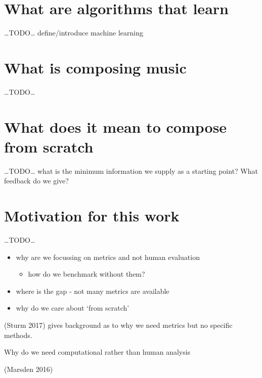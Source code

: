 \documentclass[12pt,a4paper,]{report}
\providecommand{\tightlist}{%
  \setlength{\itemsep}{0pt}\setlength{\parskip}{0pt}}
\begin{document}
\hypertarget{what-are-algorithms-that-learn}{%
\section{What are algorithms that
learn}\label{what-are-algorithms-that-learn}}

\ldots TODO\ldots{} define/introduce machine learning

\hypertarget{what-is-composing-music}{%
\section{What is composing music}\label{what-is-composing-music}}

\ldots TODO\ldots{}

\hypertarget{what-does-it-mean-to-compose-from-scratch}{%
\section{What does it mean to compose from
scratch}\label{what-does-it-mean-to-compose-from-scratch}}

\ldots TODO\ldots{} what is the minimum information we supply as a
starting point? What feedback do we give?

\hypertarget{motivation-for-this-work}{%
\section{Motivation for this work}\label{motivation-for-this-work}}

\ldots TODO\ldots{}

\begin{itemize}
\tightlist
\item
  why are we focussing on metrics and not human evaluation

  \begin{itemize}
  \tightlist
  \item
    how do we benchmark without them?
  \end{itemize}
\item
  where is the gap - not many metrics are available
\item
  why do we care about `from scratch'
\end{itemize}

(Sturm 2017) gives background as to why we need metrics but no specific
methods.

Why do we need computational rather than human analysis

(Marsden 2016)
\end{document}

